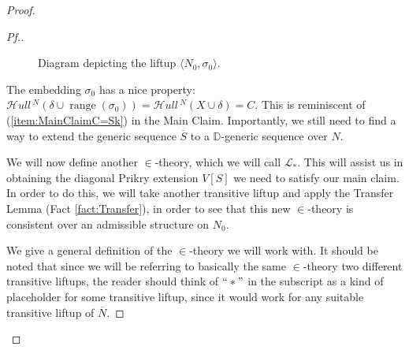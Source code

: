 \documentclass{amsart}
\theoremstyle{definition}
\theoremstyle{remark}
\newcommand{\D}{\mathbb{D}}
\newcommand{\N}{{\overline{N}}}
\renewcommand{\S}{{\overline{S}}}
\DeclareMathOperator{\ran}{range}
\newcommand{\SH}{\mathcal{H}\textit{ull} \,}
\newcommand{\sk}[3]{\SH^{#1}( {#2} \cup {\ran(#3)} ) }
\newcommand{\Sk}[3]{\SH^{#1}( {#2} \cup {#3} ) }
\begin{document}
\begin{proof}
\begin{proof}[Pf.]
\begin{figure}[h!]
 \caption{Diagram depicting the liftup $\langle N_0, \sigma_0\rangle$.}
\end{figure}

The embedding $\sigma_0$ has a nice property: $\sk{N}{\delta}{\sigma_0}=\Sk{N}{X}{\delta}= C.$ This is reminiscent of (\ref{item:MainClaimC=Sk}) in the Main Claim. 
Importantly, we still need to find a way to extend the generic sequence $\S$ to a $\D$-generic sequence over $N$. 

We will now define another $\in$-theory, which we will call $\mathcal L_*$. 
This will assist us in obtaining the diagonal Prikry extension $V[S]$ we need to satisfy our main claim. In order to do this, we will take another transitive liftup and apply the Transfer Lemma (Fact \ref{fact:Transfer}), in order to see that this new $\in$-theory is consistent over an admissible structure on $N_0$. 

We give a general definition of the $\in$-theory we will work with. It should be noted that since we will be referring to basically the same $\in$-theory two different transitive liftups, the reader should think of $``*"$ in the subscript as a kind of placeholder for some transitive liftup, since it would work for any suitable transitive liftup of $\N$.




\end{proof}
\end{proof}
\end{document}
